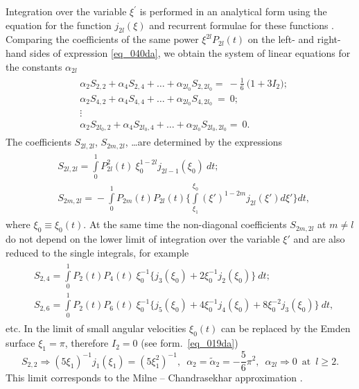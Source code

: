 \documentclass{caosp308}
\begin{document}
Integration over the variable $\xi^{'}$ is performed in an analytical form using the equation for the function $j_{2l}(\xi)$ and recurrent formulae for these functions \citep{1970hmfw.book.....A}. Comparing the coefficients of the same power $\xi^{2l} P_{2l}(t)$ on the left- and right-hand sides of  expression \eqref{eq_040da}, we obtain the system of linear equations for the constants  $\alpha_{2l}$
\begin{eqnarray}
\label{eq_042da}
\begin{split}
& \alpha_2 S_{2,2}+\alpha_4 S_{2,4} +\ldots+\alpha_{2l_0} S_{2,2l_0} =\:-\frac{1}{6}\:\biggl(1+3I_2\biggr);
\\
& \alpha_2 S_{4,2} +\alpha_4 S_{4,4} +\ldots+ \alpha_{2l_0} S_{4,2l_0} \:=\:0;
\\
& \vdots
\\
& \alpha_2 S_{2l_0,2} + \alpha_4 S_{2l_0,4} +\ldots+ \alpha_{2l_0} S_{2l_0,2l_0} =\:0.
\end{split}
\end{eqnarray}
The coefficients $S_{2l,2l}$, $S_{2m,2l}$, \ldots are determined by the expressions
\begin{eqnarray}
\label{eq_043da}
\begin{split}
& S_{2l,2l} = \int\limits^1_0 P^2_{2l}(t)\: \xi^{1-2l}_0 j_{2l-1}(\xi_0)\: dt;\\
& S_{2m,2l}\!=\!-\!\int\limits_{0}^{1}P_{2m}(t)P_{2l}(t)\biggl\{\int\limits_{\xi_1}^{\xi_0}\!\!(\xi')^{1-2m}j_{2l}(\xi')d\xi'\biggr\}dt,
\end{split}
\end{eqnarray}
where $\xi_0\equiv\xi_0(t)$. At the same time the non-diagonal coefficients $S_{2m,2l}$ at $m\ne l$ do not depend on the lower limit of integration over the variable $\xi'$ and are also reduced to the single integrals, for example
\begin{eqnarray}
\label{eq_044da}
\begin{split}
& S_{2,4}=\int\limits^1_0P_2(t)P_4 (t)\:\xi^{-1}_0\{j_3(\xi_0)+2\xi^{-1}_0 j_2(\xi_0)\}\:dt;\\
& S_{2,6}=\int\limits^1_0P_2(t)P_6 (t)\:\xi^{-1}_0\{j_5(\xi_0)+4\xi^{-1}_0 j_4(\xi_0)+8\xi^{-2}_0j_3(\xi_0)\}\:dt,
\end{split}
\end{eqnarray}
etc. In the limit of small angular velocities $\xi_0(t)$ can be replaced by the Emden surface $\xi_1=\pi$, therefore $I_2=0$ (see form.~\eqref{eq_019da})
\begin{equation}
\label{eq_045da}
S_{2,2}\Rightarrow(5\xi_1)^{-1}j_1(\xi_1)=(5\xi_1^2)^{-1},\,\,\,
\alpha_2=\tilde{\alpha}_2=-\frac{5}{6}\pi^2,\,\,\,\alpha_{2l}\Rightarrow0\,\,\,\text{at}\,\,\,l\geq2.
\end{equation}
This limit corresponds to the Milne -- Chandrasekhar approximation \citep{1923MNRAS..83..118M,1933MNRAS..93..390C}.
\end{document}
